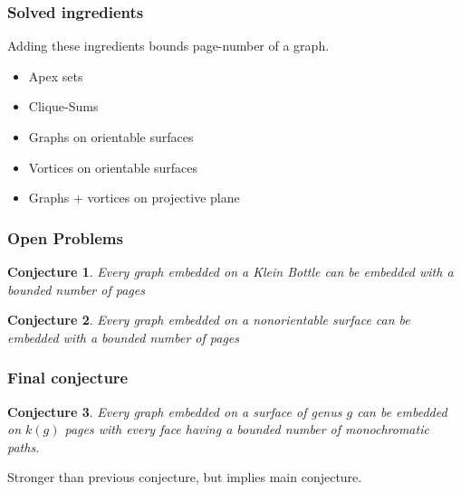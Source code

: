 \documentclass{beamer}
\newtheorem{conjecture}{Conjecture}
\begin{document}
\begin{frame}
  \frametitle{Solved ingredients}
  Adding these ingredients bounds page-number of a graph.
  \begin{itemize}
    \item Apex sets
    \item Clique-Sums
    \item Graphs on orientable surfaces 
    \item Vortices on orientable surfaces
    \item Graphs + vortices on projective plane
  \end{itemize}
\end{frame}

\begin{frame}
  \frametitle{Open Problems}
  \begin{conjecture}
    Every graph embedded on a Klein Bottle can be embedded with a bounded number of pages
  \end{conjecture}
  \begin{conjecture}
    Every graph embedded on a nonorientable surface can be embedded with a bounded number of pages
  \end{conjecture}
\end{frame}

\begin{frame}
  \frametitle{Final conjecture}
  \begin{conjecture}
      Every graph embedded on a surface of genus $g$ can be embedded on $k(g)$ pages with every face having a bounded number of monochromatic paths.
  \end{conjecture}
  Stronger than previous conjecture, but implies main conjecture. 
\end{frame}
\end{document}
